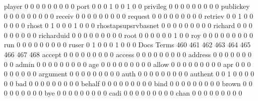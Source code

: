 \documentclass[compress,8pt]{beamer}
\begin{document}
\begin{frame}
\begin{Schunk}
  player                                     0   0   0   0   0   0   0   0   0
  port                                       0   0   0   1   0   0   1   0   0
  privileg                                   0   0   0   0   0   0   0   0   0
  publickey                                  0   0   0   0   0   0   0   0   0
  receiv                                     0   0   0   0   0   0   0   0   0
  request                                    0   0   0   0   0   0   0   0   0
  retriev                                    0   0   1   0   0   0   0   0   0
  rhost                                      0   1   0   0   0   1   0   0   0
  rhostapsupsrvbasnet                        0   0   0   0   0   0   0   0   0
  richard                                    0   0   0   0   0   0   0   0   0
  richarduid                                 0   0   0   0   0   0   0   0   0
  root                                       0   0   0   0   0   0   1   0   0
  roy                                        0   0   0   0   0   0   0   0   0
  run                                        0   0   0   0   0   0   0   0   0
  ruser                                      0   1   0   0   0   1   0   0   0
                                          Docs
Terms                                      460 461 462 463 464 465 466 467 468
  accept                                     0   0   0   0   0   0   0   0   0
  access                                     0   0   0   0   0   0   0   0   0
  address                                    0   0   0   0   0   0   0   0   0
  admin                                      0   0   0   0   0   0   0   0   0
  age                                        0   0   0   0   0   0   0   0   0
  allow                                      0   0   0   0   0   0   0   0   0
  apr                                        0   0   0   0   0   0   0   0   0
  argument                                   0   0   0   0   0   0   0   0   0
  auth                                       0   0   0   0   0   0   0   0   0
  authent                                    0   0   1   0   0   0   0   0   0
  bad                                        0   0   0   0   0   0   0   0   0
  behalf                                     0   0   0   0   0   0   0   0   0
  bind                                       0   0   0   0   0   0   0   0   0
  brown                                      0   0   0   0   0   0   0   0   0
  bye                                        0   0   0   0   0   0   0   0   0
  cadi                                       0   0   0   0   0   0   0   0   0
  chan                                       0   0   0   0   0   0   0   0   0

\end{Schunk}
\end{frame}
\end{document}
